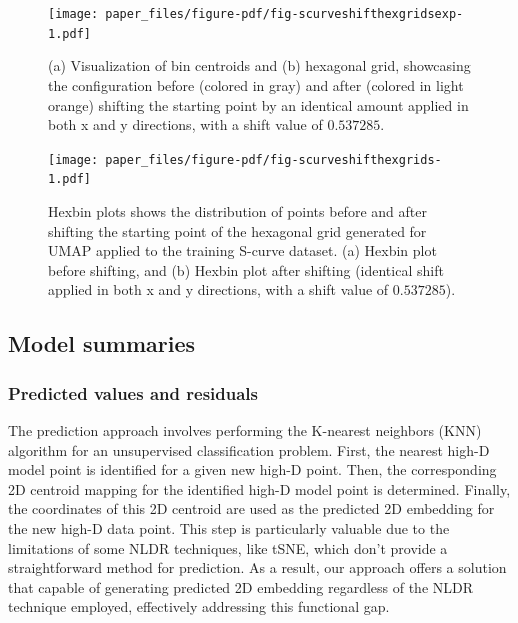 \documentclass[
  12pt]{article}
\begin{document}
\begin{figure}

{\centering \texttt{[image: paper\_files/figure-pdf/fig-scurveshifthexgridsexp-1.pdf]}

}

\caption{\label{fig-scurveshifthexgridsexp}(a) Visualization of bin
centroids and (b) hexagonal grid, showcasing the configuration before
(colored in gray) and after (colored in light orange) shifting the
starting point by an identical amount applied in both x and y
directions, with a shift value of \(0.537285\).}

\end{figure}

\begin{figure}

{\centering \texttt{[image: paper\_files/figure-pdf/fig-scurveshifthexgrids-1.pdf]}

}

\caption{\label{fig-scurveshifthexgrids}Hexbin plots shows the
distribution of points before and after shifting the starting point of
the hexagonal grid generated for UMAP applied to the training S-curve
dataset. (a) Hexbin plot before shifting, and (b) Hexbin plot after
shifting (identical shift applied in both x and y directions, with a
shift value of \(0.537285\)).}

\end{figure}

\hypertarget{sec-summary}{%
\subsection{Model summaries}\label{sec-summary}}

\hypertarget{predicted-values-and-residuals}{%
\subsubsection{Predicted values and
residuals}\label{predicted-values-and-residuals}}

The prediction approach involves performing the K-nearest neighbors
(KNN) algorithm for an unsupervised classification problem. First, the
nearest high-D model point is identified for a given new high-D point.
Then, the corresponding 2D centroid mapping for the identified high-D
model point is determined. Finally, the coordinates of this 2D centroid
are used as the predicted 2D embedding for the new high-D data point.
This step is particularly valuable due to the limitations of some NLDR
techniques, like tSNE, which don't provide a straightforward method for
prediction. As a result, our approach offers a solution that capable of
generating predicted 2D embedding regardless of the NLDR technique
employed, effectively addressing this functional gap.
\end{document}
